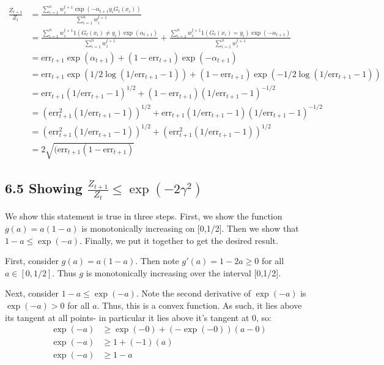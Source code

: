 \documentclass[paper=a4, fontsize=11pt]{scrartcl} %
\numberwithin{equation}{section} %
\numberwithin{figure}{section} %
\numberwithin{table}{section} %
\begin{document}
\begin{align*}
\frac{Z_{t+1}}{Z_t} &=\frac{\sum_{i =1}^n w_i^{t+1}\exp(-\alpha_{t+1}y_iG_t(x_i))}{ \sum_{i =1}^n w_i^{t+1}} \\
&= \frac{\sum_{i =1}^n w_i^{t+1} 1(G_t(x_i) \ne y_i) \exp(\alpha_{t+1})}{ \sum_{i =1}^n w_i^{t+1}}  +  \frac{\sum_{i =1}^n w_i^{t+1} 1(G_t(x_i) = y_i) \exp(-\alpha_{t+1})}{ \sum_{i =1}^n w_i^{t+1}} \\
&= \mathrm{err}_{t+1}\exp(\alpha_{t+1}) + (1- \mathrm{err}_{t+1})\exp(-\alpha_{t+1}) \\
&= \mathrm{err}_{t+1}\exp(1/2 \log(1/ \mathrm{err}_{t+1} - 1)) + (1- \mathrm{err}_{t+1})\exp(-1/2 \log(1/ \mathrm{err}_{t+1} - 1)) \\
&= \mathrm{err}_{t+1}(1/ \mathrm{err}_{t+1} - 1)^{1/2} + (1- \mathrm{err}_{t+1})(1/ \mathrm{err}_{t+1} - 1)^{-1/2} \\
&= (\mathrm{err}_{t+1}^2(1/ \mathrm{err}_{t+1} - 1))^{1/2} + \mathrm{err}_{t+1}(1/\mathrm{err}_{t+1} - 1)(1/ \mathrm{err}_{t+1} - 1)^{-1/2} \\
&= (\mathrm{err}_{t+1}^2(1/ \mathrm{err}_{t+1} - 1))^{1/2} + (\mathrm{err}_{t+1}^2(1/ \mathrm{err}_{t+1} - 1))^{1/2}\\
&= 2\sqrt{(\mathrm{err}_{t+1}(1 - \mathrm{err}_{t+1})}
\end{align*}

\subsection*{6.5 Showing $\frac{Z_{t+1}}{Z_t} \leq \exp(-2 \gamma^2)$}

We show this statement is true in three steps. First, we show the function $g(a) = a(1-a)$ is monotonically increasing on [0,1/2]. Then we show that $1-a \leq \exp(-a)$. Finally, we put it together to get the desired result.

First, consider $g(a) = a(1-a)$. Then note $g'(a) = 1-2a \geq 0$ for all $a \in [0,1/2]$. Thus $g$ is monotonically increasing over the interval [0,1/2].

Next, consider $1-a \leq \exp(-a)$. Note the second derivative of $\exp(-a)$ is $\exp(-a) > 0$ for all $a$. Thus, this is a convex function. As such, it lies above its tangent at all points- in particular it lies above it's tangent at 0, so:
\begin{align*}
\exp(-a) &\geq \exp(-0) + (-\exp(-0))(a - 0) \\
\exp(-a) &\geq 1 + (-1)(a) \\
\exp(-a) &\geq 1 - a
\end{align*}
\end{document}
